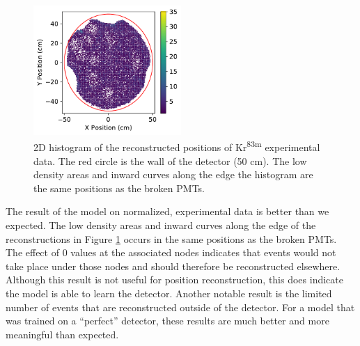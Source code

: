 \documentclass[thesis.tex]{subfiles}
\begin{document}
\begin{figure}[t]
	\centering
	\includegraphics[width=0.5\textwidth]{figures/iso-kr83_reco_pos.pdf}
	\caption{
	2D histogram of the reconstructed positions of Kr\textsuperscript{83m} experimental data.
	The red circle is the wall of the detector (50 cm).
	The low density areas and inward curves along the edge the histogram are the same positions as the broken PMTs.
	}
	\label{fig:iso_2D-hist}
\end{figure}

\par The result of the model on normalized, experimental data is better than we expected.
The low density areas and inward curves along the edge of the reconstructions in Figure \ref{fig:iso_2D-hist} occurs in the same positions as the broken PMTs.
The effect of 0 values at the associated nodes indicates that events would not take place under those nodes and should therefore be reconstructed elsewhere.
Although this result is not useful for position reconstruction, this does indicate the model is able to learn the detector.
Another notable result is the limited number of events that are reconstructed outside of the detector.
For a model that was trained on a ``perfect'' detector, these results are much better and more meaningful than expected.
\end{document}
